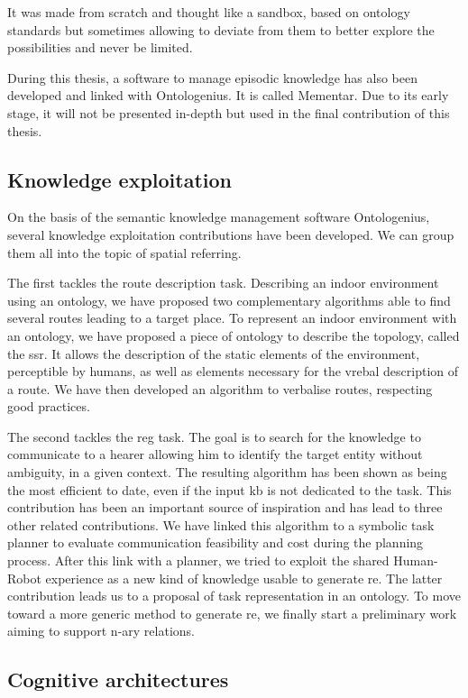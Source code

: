 It was made from scratch and thought like a sandbox, based on ontology standards but sometimes allowing to deviate from them to better explore the possibilities and never be limited.

During this thesis, a software to manage episodic knowledge has also been developed and linked with Ontologenius. It is called Mementar. Due to its early stage, it will not be presented in-depth but used in the final contribution of this thesis. 

\subsection{Knowledge exploitation}

On the basis of the semantic knowledge management software Ontologenius, several knowledge exploitation contributions have been developed. We can group them all into the topic of spatial referring.

The first tackles the route description task. Describing an indoor environment using an ontology, we have proposed two complementary algorithms able to find several routes leading to a target place. To represent an indoor environment with an ontology, we have proposed a piece of ontology to describe the topology, called the \acrlong{ssr}. It allows the description of the static elements of the environment, perceptible by humans, as well as elements necessary for the vrebal description of a route. We have then developed an algorithm to verbalise routes, respecting good practices.

The second tackles the \acrlong{reg} task. The goal is to search for the knowledge to communicate to a hearer allowing him to identify the target entity without ambiguity, in a given context. The resulting algorithm has been shown as being the most efficient to date, even if the input \acrshort{kb} is not dedicated to the task. This contribution has been an important source of inspiration and has lead to three other related contributions. We have linked this algorithm to a symbolic task planner to evaluate communication feasibility and cost during the planning process. After this link with a planner, we tried to exploit the shared Human-Robot experience as a new kind of knowledge usable to generate \acrlong{re}. The latter contribution leads us to a proposal of task representation in an ontology. To move toward a more generic method to generate \acrlong{re}, we finally start a preliminary work aiming to support n-ary relations.

\subsection{Cognitive architectures}

